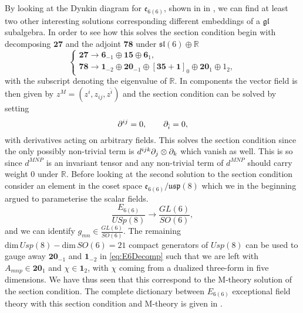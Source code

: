 By looking at the Dynkin diagram for $\mathfrak{e}_{6(6)}$, shown in in , we can find at least two other interesting solutions corresponding different embeddings of a $\mathfrak{gl}$ subalgebra. In order to see how this solves the section condition begin with decomposing $\mathbf{27}$ and the adjoint $\mathbf{78}$ under $\mathfrak{sl}(6)\oplus\mathbb{R}$
\begin{equation}
    \begin{cases}\label{eq:E6Decomp}
        \mathbf{27}\to \mathbf{6}_{-1}\oplus\mathbf{15}\oplus \mathbf{6}_{1},\\
        \mathbf{78}\to \mathbf{1}_{-2}\oplus\mathbf{20}_{-1}\oplus\left[\mathbf{35}+\mathbf{1}\right]_{0}\oplus\mathbf{20}_{1}\oplus 1_{2},
    \end{cases}
\end{equation}
with the subscript denoting the eigenvalue of $\mathbb{R}$. In components the vector field is then given by $z^M = (z^i,z_{ij},z^{\hat{i}})$ and the section condition can be solved by setting
\begin{equation}
    \partial^{ij} = 0,\qquad \partial_{\hat{i}} = 0,
\end{equation}
with derivatives acting on arbitrary fields. This solves the section condition since the only possibly non-trivial term is $d^{ijk}\partial_j\otimes\partial_k$ which vanish as well. This is so since $d^{MNP}$ is an invariant tensor and any non-trivial term of $d^{MNP}$ should carry weight $0$ under $\mathbb{R}$. Before looking at the second solution to the section condition consider an element in the coset space $\mathfrak{e}_{6(6)}/\mathfrak{usp}(8)$ which we in the beginning argued to parameterise the scalar fields. 
\begin{equation}
    \frac{E_{6(6)}}{USp(8)}\to \frac{GL(6)}{SO(6)},
\end{equation}
and we can identify $g_{mn}\in\frac{GL(6)}{SO(6)}$. The remaining $\text{dim}\, Usp(8)-\text{dim}\, SO(6)=21$ compact generators of $Usp(8)$ can be used to gauge away $\mathbf{20}_{-1}$ and $\mathbf{1}_{-2}$ in \eqref{eq:E6Decomp} such that we are left with $A_{mnp}\in \mathbf{20}_1$ and $\chi\in \mathbf{1}_{2}$, with $\chi$ coming from a dualized three-form in five dimensions. We have thus seen that this correspond to the M-theory solution of the section condition. The complete dictionary between $E_{6(6)}$ exceptional field theory with this section condition and M-theory is given in \cite{E62014}. 

